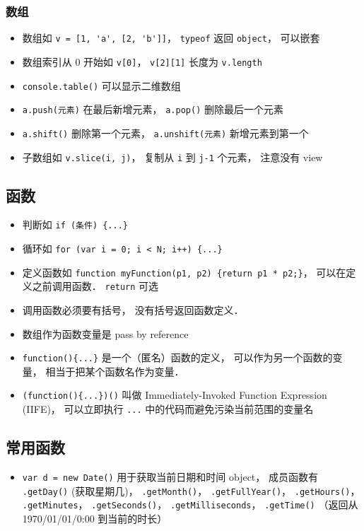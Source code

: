 \subsubsection{数组}
\begin{itemize}
\item 数组如 \verb|v = [1, 'a', [2, 'b']]|， \verb|typeof| 返回 \verb|object|， 可以嵌套
\item 数组索引从 0 开始如 \verb|v[0]|， \verb|v[2][1]| 长度为 \verb|v.length|
\item \verb|console.table()| 可以显示二维数组
\item \verb|a.push(元素)| 在最后新增元素， \verb|a.pop()| 删除最后一个元素
\item \verb|a.shift()| 删除第一个元素， \verb|a.unshift(元素)| 新增元素到第一个
\item 子数组如 \verb|v.slice(i, j)|， 复制从 \verb|i| 到 \verb|j-1| 个元素， 注意没有 view
\end{itemize}

\subsection{函数}
\begin{itemize}
\item 判断如 \verb|if (条件) {...}|
\item 循环如 \verb|for (var i = 0; i < N; i++) {...}|
\item 定义函数如 \verb|function myFunction(p1, p2) {return p1 * p2;}|， 可以在定义之前调用函数． \verb|return| 可选
\item 调用函数必须要有括号， 没有括号返回函数定义．
\item 数组作为函数变量是 pass by reference
\item \verb|function(){...}| 是一个（匿名）函数的定义， 可以作为另一个函数的变量， 相当于把某个函数名作为变量．
\item \verb|(function(){...})()| 叫做 Immediately-Invoked Function Expression (IIFE)， 可以立即执行 \verb|...| 中的代码而避免污染当前范围的变量名
\end{itemize}

\subsection{常用函数}
\begin{itemize}
\item \verb|var d = new Date()| 用于获取当前日期和时间 object， 成员函数有 \verb|.getDay()| (获取星期几)， \verb|.getMonth()|， \verb|.getFullYear()|， \verb|.getHours()|， \verb|.getMinutes|， \verb|.getSeconds()|， \verb|.getMilliseconds|， \verb|.getTime()| （返回从 1970/01/01/0:00 到当前的时长）
\end{itemize}

